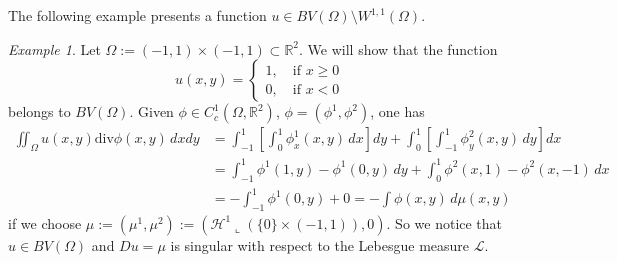 \documentclass[12pt]{article}
\newcommand{\R}{\mathbb R}
\theoremstyle{remark}
\newtheorem{example}{Example}
\begin{document}
The following example presents a function $u\in BV(\Omega)\setminus W^{1,1}(\Omega)$.
\begin{example}
Let $\Omega:=(-1,1)\times(-1,1)\subset \R^2$. We will show that the function
\[
u(x,y)=\begin{cases}
1,\quad\text{if $x\ge 0$}\\
0,\quad\text{if $x< 0$}\end{cases}
\]
belongs to $BV(\Omega)$.
Given $\phi\in C_c^1(\Omega,\R^2)$, $\phi=(\phi^1,\phi^2)$, one has
\begin{align*}
\iint_\Omega u(x,y)\mathrm{div}\phi(x,y)\, dxdy
&=\int_{-1}^1 \left[\int_0^1 \phi^1_x(x,y)\, dx \right]dy
+ \int_0^1 \left[\int_{-1}^1 \phi^2_y(x,y)\, dy \right]dx\\
&=\int_{-1}^1 \phi^1(1,y)-\phi^1(0,y)\, dy + \int_0^1 \phi^2(x,1)-\phi^2(x,-1)\, dx\\
&=-\int_{-1}^1 \phi^1(0,y) + 0
=-\int \phi(x,y)\,d \mu(x,y)
\end{align*}
if we choose $\mu:=(\mu^1,\mu^2):=(\mathcal H^1\llcorner(\{0\}\times(-1,1)),0)$. So we notice that $u\in BV(\Omega)$ and $Du=\mu$ is singular with respect to the Lebesgue measure $\mathcal L$.
\end{example}
\end{document}
